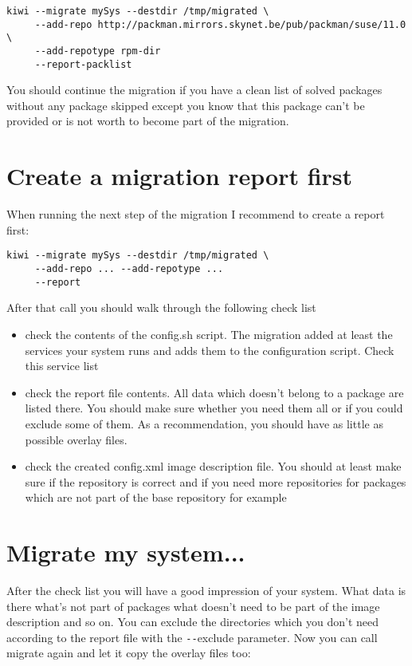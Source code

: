 \begin{Command}{12cm}
\begin{verbatim}
kiwi --migrate mySys --destdir /tmp/migrated \
     --add-repo http://packman.mirrors.skynet.be/pub/packman/suse/11.0 \
     --add-repotype rpm-dir
     --report-packlist
\end{verbatim}
\end{Command}

You should continue the migration if you have a clean list of solved
packages without any package skipped except you know that this package
can't be provided or is not worth to become part of the migration.

\section{Create a migration report first}
When running the next step of the migration I
recommend to create a report first:

\begin{Command}{12cm}
\begin{verbatim}
kiwi --migrate mySys --destdir /tmp/migrated \
     --add-repo ... --add-repotype ...
     --report
\end{verbatim}
\end{Command}

After that call you should walk through the following check list

\begin{itemize}
\item check the contents of the config.sh script. The migration
      added at least the services your system runs and adds them
      to the configuration script. Check this service list
\item check the report file contents. All data which doesn't belong
      to a package are listed there. You should make sure whether you
      need them all or if you could exclude some of them. As a
      recommendation, you should have as little as possible overlay
      files.
\item check the created config.xml image description file. You should
      at least make sure if the repository is correct and if you need
      more repositories for packages which are not part of the base
      repository for example
\end{itemize}

\section{Migrate my system...}
After the check list you will have a good impression of your system.
What data is there what's not part of packages what doesn't need to
be part of the image description and so on. You can exclude the
directories which you don't need according to the report file with
the \verb+--+exclude parameter. Now you can call migrate again and let
it copy the overlay files too:

